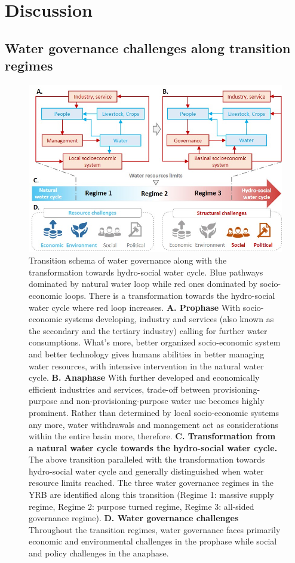 \documentclass[9pt, twocolumn, twoside, lineno]{pnas-new}
\begin{document}
\section*{Discussion}
\label{Discussion}

\subsection*{Water governance challenges along transition regimes}

\begin{figure}[htbp!]
	\centering
	\includegraphics[width=0.8\linewidth]{../../figures/main/transition.jpg}
	\caption{
		Transition schema of water governance along with the transformation towards hydro-social water cycle. Blue pathways dominated by natural water loop while red ones dominated by socio-economic loops. There is a transformation towards the hydro-social water cycle where red loop increases.
		\textbf{A. Prophase} With socio-economic systems developing, industry and services (also known as the secondary and the tertiary industry) calling for further water consumptions. What's more, better organized socio-economic system and better technology gives humans abilities in better managing water resources, with intensive intervention in the natural water cycle. 
		\textbf{B. Anaphase} With further developed and economically efficient industries and services, trade-off between provisioning-purpose and non-provisioning-purpose water use becomes highly prominent. Rather than determined by local socio-economic systems any more, water withdrawals and management act as considerations within the entire basin more, therefore. 
		\textbf{C. Transformation from a natural water cycle towards the hydro-social water cycle.} The above transition paralleled with the transformation towards hydro-social water cycle and generally distinguished when water resource limits reached. The three water governance regimes in the YRB are identified along this transition (Regime 1: massive supply regime, Regime 2: purpose turned regime, Regime 3: all-sided governance regime).
		\textbf{D. Water governance challenges} Throughout the transition regimes, water governance faces primarily economic and environmental challenges in the prophase while social and policy challenges in the anaphase.
	}
	\label{fig:summary}
\end{figure}
\end{document}
